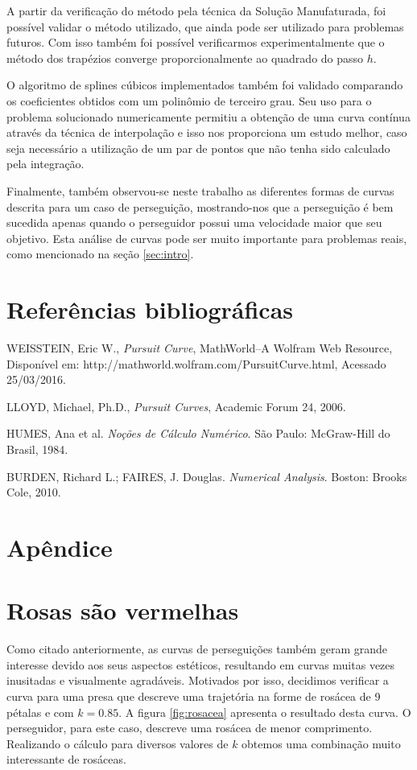 \documentclass[a4paper,10pt]{article}
\begin{document}
  A partir da verificação do método pela técnica da Solução Manufaturada, foi possível validar o método utilizado, que ainda pode ser utilizado para problemas futuros. Com isso também foi possível verificarmos experimentalmente que o método dos trapézios converge proporcionalmente ao quadrado do passo $h$.
  
  O algoritmo de splines cúbicos implementados também foi validado comparando os coeficientes obtidos com um polinômio de terceiro grau. Seu uso para o problema solucionado numericamente permitiu a obtenção de uma curva contínua através da técnica de interpolação e isso nos proporciona um estudo melhor, caso seja necessário a utilização de um par de pontos que não tenha sido calculado pela integração.
  
  Finalmente, também observou-se neste trabalho as diferentes formas de curvas descrita para um caso de perseguição, mostrando-nos que a perseguição é bem sucedida apenas quando o perseguidor possui uma velocidade maior que seu objetivo. Esta análise de curvas pode ser muito importante para problemas reais, como mencionado na seção \ref{sec:intro}.
  
  \section{Referências bibliográficas}
  

  \begin{thebibliography}{9}
      WEISSTEIN, Eric W.,
      \emph{Pursuit Curve},
      MathWorld--A Wolfram Web Resource,
      Disponível em: http://mathworld.wolfram.com/PursuitCurve.html,
      Acessado 25/03/2016.

      LLOYD, Michael, Ph.D.,
      \emph{Pursuit Curves},
      Academic Forum 24,
      2006.
      
      HUMES, Ana et al. \emph{Noções de Cálculo Numérico}. São Paulo: McGraw-Hill do Brasil, 1984.
     
      BURDEN, Richard L.; FAIRES, J. Douglas. \emph{Numerical Analysis}. Boston: Brooks Cole, 2010.  

  \end{thebibliography}
  
  \section{Apêndice}
  \appendix
  \section{Rosas são vermelhas}
  Como citado anteriormente, as curvas de perseguições também geram grande interesse devido aos seus aspectos estéticos, resultando em curvas muitas vezes inusitadas e visualmente agradáveis.
  Motivados por isso, decidimos verificar a curva para uma presa que descreve uma trajetória na forme de rosácea de 9 pétalas e com $k = 0.85$. A figura \ref{fig:rosacea} apresenta o resultado desta curva. O perseguidor, para este caso, descreve uma rosácea de menor comprimento. Realizando o cálculo para diversos valores de $k$ obtemos uma combinação muito interessante de rosáceas.
  
\end{document}
